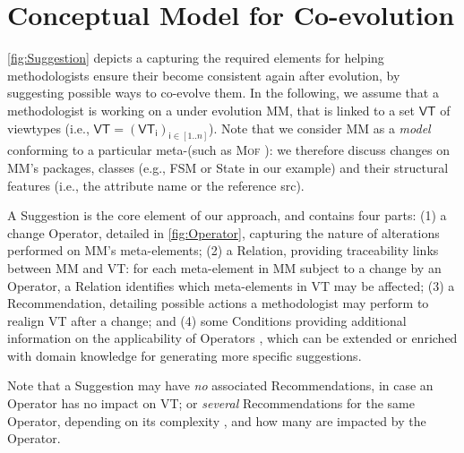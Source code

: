 \section{Conceptual Model for \Viewtype Co-evolution}
\label{sec:Suggestion}

\cref{fig:Suggestion} depicts a \metamodel capturing the
required elements for helping methodologists ensure their \viewtypes become consistent again after \metamodel evolution,
by suggesting possible ways to co-evolve them.
In the following, we assume that a methodologist is working on a \metamodel
under evolution \textsf{MM}, that is linked to a set $\mathsf{VT}$ of viewtypes
(i.e., $\mathsf{VT} = (\mathsf{VT}_\mathsf{i})_{\mathsf{i}\in [1..n]}$). Note that
we consider \textsf{MM} as a \emph{model}
conforming to a particular meta-\metamodel (such as \textsc{Mof} \cite{TR:OMG-MOF:2016}):
we therefore discuss changes on \textsf{MM}'s packages, classes (e.g., 
\textsf{FSM} or \textsf{State} in our example) and their structural features
(i.e., the attribute \textsf{name} or the reference \textsf{src}).

A \textsf{Suggestion} is the core element of our approach, and contains four 
parts: (1) a change \textsf{Operator}, detailed in \cref{fig:Operator}, 
capturing the nature of alterations performed on \textsf{MM}'s meta-elements; 
(2) a \textsf{Relation}, providing traceability links between \textsf{MM} 
and \textsf{VT}: for each meta-element in \textsf{MM} subject to a 
change by an \textsf{Operator}, a \textsf{Relation} identifies which 
meta-elements in \textsf{VT} may be affected;
(3) a \textsf{Recommendation}, detailing possible actions a methodologist 
may perform to realign \textsf{VT} after a change; and 
(4) some \textsf{Condition}s providing additional information on the applicability
of \textsf{Operator}s , which can be extended or enriched with domain knowledge 
for generating more specific suggestions.


Note that a \textsf{Suggestion} may 
have \emph{no} associated \textsf{Recommendation}s, in case an \textsf{Operator} has no
impact on \textsf{VT}; or \emph{several} \textsf{Recommendation}s for the same 
\textsf{Operator}, depending on its complexity 
, and how many \viewtypes are 
impacted by the \textsf{Operator}. 

